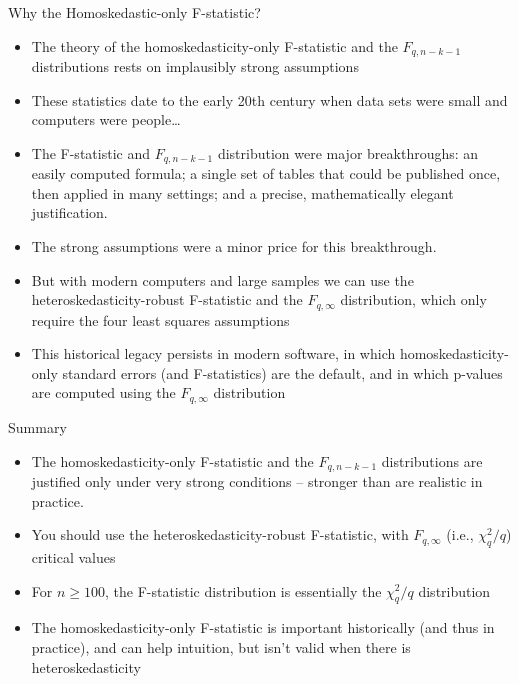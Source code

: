 \documentclass[notes,10pt, aspectratio=169]{beamer}
\begin{document}
\begin{frame}{Why the Homoskedastic-only F-statistic?}
\begin{itemize}
    \item The theory of the homoskedasticity-only F-statistic and the $F_{q,n-k-1}$ distributions rests on implausibly strong assumptions
    \item These statistics date to the early 20th century when data sets were small and computers were people…
    \item The F-statistic and $F_{q,n-k-1}$ distribution were major breakthroughs: an easily computed formula; a single set of tables that could be published once, then applied in many settings; and a precise, mathematically elegant justification.
    \item The strong assumptions were a minor price for this breakthrough.
    \item But with modern computers and large samples we can use the heteroskedasticity-robust F-statistic and the $F_{q,\infty}$ distribution, which only require the four least squares assumptions
    \item This historical legacy persists in modern software, in which homoskedasticity-only standard errors (and F-statistics) are the default, and in which p-values are computed using the $F_{q,\infty}$ distribution
\end{itemize}
\end{frame}

\begin{frame}{Summary}
\begin{itemize}
    \item The homoskedasticity-only F-statistic and the $F_{q,n-k-1}$ distributions are justified only under very strong conditions – stronger than are realistic in practice.\\[1em]
    \item You should use the heteroskedasticity-robust F-statistic, with $F_{q,\infty}$ (i.e., $\chi^2_q/q$) critical values\\[1em]
    \item For $n\geq100$, the F-statistic distribution is essentially the $\chi^2_q/q$ distribution\\[1em]
    \item The homoskedasticity-only F-statistic is important historically (and thus in practice), and can help intuition, but isn’t valid when there is heteroskedasticity
\end{itemize}
\end{frame}
\end{document}
